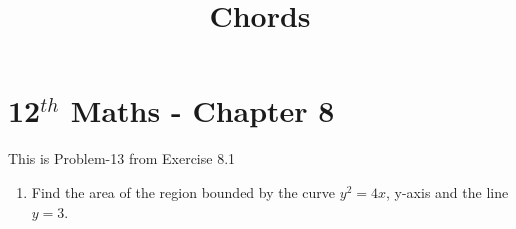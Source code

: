\documentclass[12pt]{article}
\begin{document}
\begin{center}
\title{\textbf{Chords}}
\date{\vspace{-5ex}} %
\maketitle
\end{center}
\setcounter{page}{1}

\section{12$^{th}$ Maths - Chapter 8}
This is Problem-13 from Exercise 8.1 
\begin{enumerate}
\item Find the area of the region bounded by the curve $y^2 = 4x$, y-axis and the line $y = 3$. 


\end{enumerate}
\end{document}
